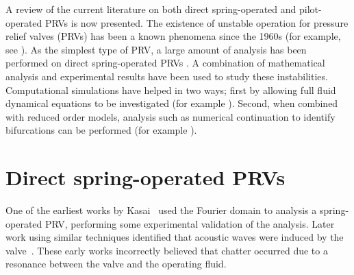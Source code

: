 
% 
A review of the current literature on both direct spring-operated and pilot-operated PRVs is now presented. The existence of unstable operation for pressure relief valves (PRVs) has been a known phenomena since the 1960s (for example, see \cite{Kasai1968OnSystem}).
As the simplest type of  PRV, a large amount of analysis has been performed on direct spring-operated PRVs \cite{Kasai1968OnSystem,Thomann1976OscillationsPipe,Hayashi1995InstabilityCircuit,Darby2013TheModel,Bazso2013AnValve,Erdodi2017PredictionModelling,Hos2015ModelPipe,Hos2017DynamicRecommendations}. A combination of mathematical analysis and experimental results have been used to study these instabilities. Computational simulations have helped  in two ways; first by allowing full fluid dynamical equations
to be investigated (for example \cite{Erdodi2017PredictionModelling,Hos2015ModelPipe}). Second, when combined with reduced order models, analysis such as numerical continuation to identify bifurcations can be performed (for example \cite{Hos2015DynamicModelling}).

\section{Direct spring-operated PRVs}

One of the earliest works by Kasai~\cite{Kasai1968OnSystem} used the Fourier domain to analysis a spring-operated PRV, performing some experimental validation of the analysis. Later work using similar techniques identified that acoustic waves were induced by the valve~\cite{Thomann1976OscillationsPipe}. These early works incorrectly believed that chatter occurred due to a resonance between the valve and the operating fluid.

